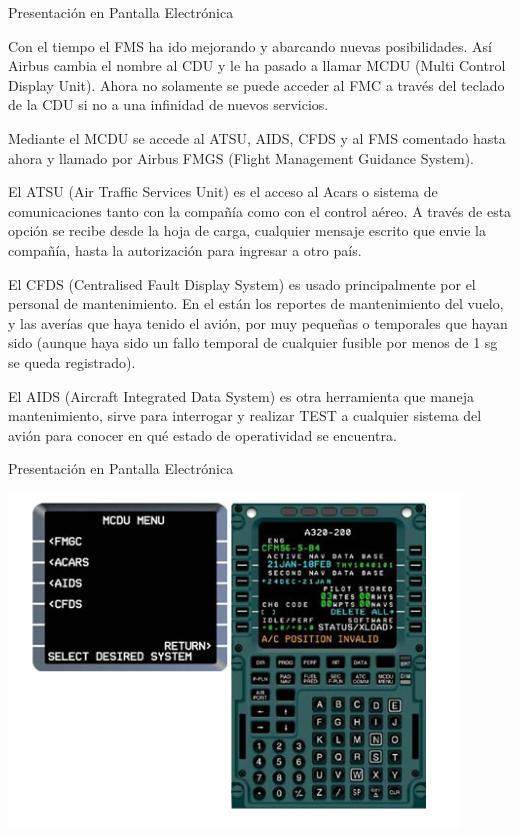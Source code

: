 \documentclass[10pt]{beamer}
\begin{document}
\begin{frame}{Presentaci\'on en Pantalla Electr\'onica}

{\small
Con el tiempo el FMS ha ido mejorando y abarcando nuevas posibilidades. As\'i Airbus cambia el nombre al CDU y le ha pasado a llamar MCDU (Multi Control Display Unit). Ahora no solamente se puede acceder al FMC a trav\'es del teclado de la CDU si no a una infinidad de nuevos servicios.

Mediante el MCDU se accede al ATSU, AIDS, CFDS y al FMS comentado hasta ahora y llamado por Airbus FMGS (Flight Management Guidance System).

    El ATSU (Air Traffic Services Unit) es el acceso al Acars o sistema de comunicaciones tanto con la compa\~n\'ia como con el control a\'ereo. A trav\'es de esta opci\'on se recibe desde la hoja de carga, cualquier mensaje escrito que envie la compa\~n\'ia, hasta la autorizaci\'on para ingresar a otro pa\'is.

    El CFDS (Centralised Fault Display System) es usado principalmente por el personal de mantenimiento. En el est\'an los reportes de mantenimiento del vuelo, y las aver\'ias que haya tenido el avi\'on, por muy peque\~nas o temporales que hayan sido (aunque haya sido un fallo temporal de cualquier fusible por menos de 1 sg se queda registrado).

    El AIDS (Aircraft Integrated Data System) es otra herramienta que maneja mantenimiento, sirve para  interrogar y realizar TEST a cualquier sistema del avi\'on para conocer en qu\'e estado de operatividad se encuentra.

}
\end{frame}

\begin{frame}{Presentaci\'on en Pantalla Electr\'onica}

    \includegraphics[width=0.9\textwidth]{imagenes/1.4.pantalla.electronica/mcdu.jpg}

\end{frame}


%    
%   
\end{document}
